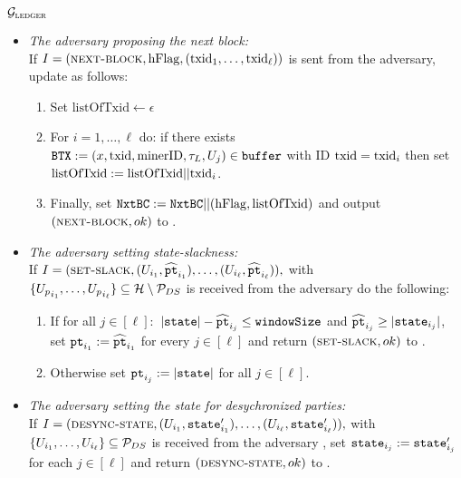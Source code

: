 \begin{systembox}{$\mathcal{G}_{\textsc{ledger}}$}
\begin{enumerate}
\begin{itemize}
        \item \emph{The adversary proposing the next block:} \\
        If $I=(\textsc{next-block}, \mathrm{hFlag}, (\text{txid}_1,\ldots,\text{txid}_\ell))$ is sent
        from the adversary, update \cbuffer as follows:%
        \begin{enumerate}\setlength\itemsep{1ex}
          \item Set $\mathrm{listOfTxid} \gets \epsilon$
          \item For $i=1,\ldots, \ell$ do: if there exists
          $\texttt{BTX}:=(x,\text{txid},\text{minerID},\tau_L,U_j)\in\texttt{buffer}$ with ID
          $\text{txid}=\text{txid}_i$ then set
          $\mathrm{listOfTxid}:=\mathrm{listOfTxid}||\text{txid}_i$.
          \item Finally, set $\texttt{NxtBC}:= \texttt{NxtBC}
          ||(\mathrm{hFlag},\mathrm{listOfTxid})$ and output $(\textsc{next-block}, ok)$ to
          \Adv.%
        \end{enumerate}
        \item \emph{The adversary setting state-slackness:}\\
        If $I=(\textsc{set-slack},(U_{i_1},\widehat{\texttt{pt}}_{i_1}),\ldots,
        (U_{i_\ell},\widehat{\texttt{pt}}_{i_\ell})),$ with
        $\{{U_p}_{i_1},\ldots,{U_p}_{i_\ell}\}\subseteq\mathcal{H}\setminus\mathcal{P}_{DS}$
        is received from the adversary \Adv do the following:%
        \begin{enumerate}\setlength\itemsep{1ex}
          \item If for all $j\in[\ell]:$  $|\texttt{state}|
          -\widehat{\texttt{pt}}_{i_j}\leq\texttt{windowSize}$ and $\widehat{\texttt{pt}}_{i_j}\geq
          |\texttt{state}_{i_j}|$, set $\texttt{pt}_{i_1}:=\widehat{\texttt{pt}}_{i_1}$ for every
          $j\in[\ell]$ and return $(\textsc{set-slack},ok)$ to \Adv.
          \item Otherwise set $\texttt{pt}_{i_j}:=|\texttt{state}|$ for all $j\in[\ell]$.
        \end{enumerate}
        \item \emph{The adversary setting the state for desychronized
        parties:}\\
        If $I=(\textsc{desync-state},(U_{i_1},\texttt{state}_{i_1}'),\ldots,
        (U_{i_\ell},\texttt{state}_{i_\ell}')),$ with
        $\{U_{i_1},\ldots,U_{i_\ell}\}\subseteq\mathcal{P}_{DS}$ is received
        from the adversary \Adv, set $\texttt{state}_{i_j}:=\texttt{state}_{i_j}'$ for each
        $j\in[\ell]$ and return $(\textsc{desync-state},ok)$ to \Adv.
      \end{itemize}
    \end{enumerate}
  \end{systembox}


